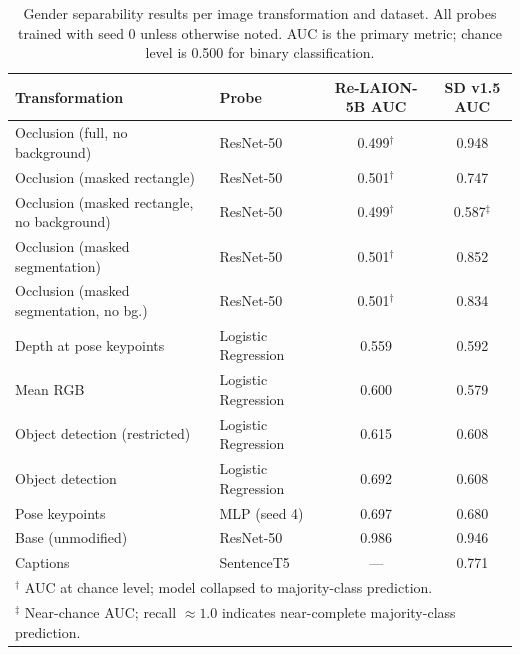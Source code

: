 \begin{table}[htbp]
	\centering
	\caption{Gender separability results per image transformation and dataset.
		All probes trained with seed 0 unless otherwise noted. AUC is the primary metric; chance level
		is 0.500 for binary classification.}
	\label{tab:gender_separability}
	\small
	\begin{tabular}{llcc}
		\toprule
		\textbf{Transformation} & \textbf{Probe} &
		\textbf{Re-LAION-5B AUC} & \textbf{SD v1.5 AUC} \\
		\midrule
		Occlusion (full, no background)             & ResNet-50           & 0.499$^\dagger$ & 0.948 \\
		Occlusion (masked rectangle)                & ResNet-50           & 0.501$^\dagger$ & 0.747 \\
		Occlusion (masked rectangle, no background) & ResNet-50           & 0.499$^\dagger$ & 0.587$^\ddagger$ \\
		Occlusion (masked segmentation)             & ResNet-50           & 0.501$^\dagger$ & 0.852 \\
		Occlusion (masked segmentation, no bg.)     & ResNet-50           & 0.501$^\dagger$ & 0.834 \\
		Depth at pose keypoints                     & Logistic Regression & 0.559           & 0.592 \\
		Mean RGB                                    & Logistic Regression & 0.600           & 0.579 \\
		Object detection (restricted)               & Logistic Regression & 0.615           & 0.608 \\
		Object detection                            & Logistic Regression & 0.692           & 0.608 \\
		Pose keypoints                              & MLP (seed 4)        & 0.697           & 0.680 \\
		Base (unmodified)                           & ResNet-50           & 0.986           & 0.946 \\
		Captions									& SentenceT5          & ---				& 0.771 \\
		\bottomrule
		\multicolumn{4}{l}{\footnotesize $^\dagger$ AUC at chance level; model collapsed to majority-class prediction.} \\
		\multicolumn{4}{l}{\footnotesize $^\ddagger$ Near-chance AUC; recall $\approx 1.0$ indicates near-complete majority-class prediction.} \\
	\end{tabular}
\end{table}

